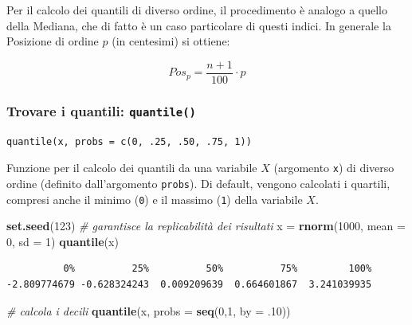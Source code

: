\documentclass[
  a4paper,
  DIV=11,
  numbers=noendperiod]{scrreprt}
\newenvironment{Shaded}{\begin{snugshade}}{\end{snugshade}}
\newcommand{\AttributeTok}[1]{\textcolor[rgb]{0.13,0.29,0.53}{#1}}
\newcommand{\CommentTok}[1]{\textcolor[rgb]{0.56,0.35,0.01}{\textit{#1}}}
\newcommand{\DecValTok}[1]{\textcolor[rgb]{0.00,0.00,0.81}{#1}}
\newcommand{\FunctionTok}[1]{\textcolor[rgb]{0.13,0.29,0.53}{\textbf{#1}}}
\newcommand{\NormalTok}[1]{#1}
\newcommand{\OtherTok}[1]{\textcolor[rgb]{0.56,0.35,0.01}{#1}}
\begin{document}
Per il calcolo dei quantili di diverso ordine, il procedimento è analogo
a quello della Mediana, che di fatto è un caso particolare di questi
indici. In generale la Posizione di ordine \(p\) (in centesimi) si
ottiene:

\begin{equation*}
Pos_p = \dfrac{n+1}{100}\cdot p 
\end{equation*}

\subsubsection{\texorpdfstring{Trovare i quantili:
\texttt{quantile()}}{Trovare i quantili: quantile()}}\label{trovare-i-quantili-quantile}

\begin{verbatim}
quantile(x, probs = c(0, .25, .50, .75, 1))
\end{verbatim}

Funzione per il calcolo dei quantili da una variabile \(X\) (argomento
\texttt{x}) di diverso ordine (definito dall'argomento \texttt{probs}).
Di default, vengono calcolati i quartili, compresi anche il minimo
(\texttt{0}) e il massimo (\texttt{1}) della variabile \(X\).

\begin{Shaded}
\begin{Highlighting}[]
\FunctionTok{set.seed}\NormalTok{(}\DecValTok{123}\NormalTok{) }\CommentTok{\# garantisce la replicabilità dei risultati}
\NormalTok{x }\OtherTok{=} \FunctionTok{rnorm}\NormalTok{(}\DecValTok{1000}\NormalTok{, }\AttributeTok{mean =} \DecValTok{0}\NormalTok{, }\AttributeTok{sd =} \DecValTok{1}\NormalTok{)}
\FunctionTok{quantile}\NormalTok{(x)}
\end{Highlighting}
\end{Shaded}

\begin{verbatim}
          0%          25%          50%          75%         100% 
-2.809774679 -0.628324243  0.009209639  0.664601867  3.241039935 
\end{verbatim}

\begin{Shaded}
\begin{Highlighting}[]
\CommentTok{\# calcola i decili }
\FunctionTok{quantile}\NormalTok{(x, }\AttributeTok{probs =} \FunctionTok{seq}\NormalTok{(}\DecValTok{0}\NormalTok{,}\DecValTok{1}\NormalTok{, }\AttributeTok{by =}\NormalTok{ .}\DecValTok{10}\NormalTok{))}
\end{Highlighting}
\end{Shaded}
\end{document}
